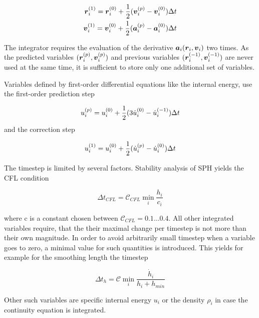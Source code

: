 \begin{eqnarray}
\label{ch02_sph02_eq020}
\boldsymbol{r}_i^{(1)} = \boldsymbol{r}_i^{(0)} + \frac{1}{2} ( \boldsymbol{v}_i^{(p)} - \boldsymbol{v}_i^{(0)} )\Delta t \\
\boldsymbol{v}_i^{(1)} = \boldsymbol{v}_i^{(0)} + \frac{1}{2} ( \boldsymbol{a}_i^{(p)} - \boldsymbol{a}_i^{(0)} )\Delta t
\end{eqnarray}

The integrator requires the evaluation of the derivative $\boldsymbol{a}_i( \boldsymbol{r}_i, \boldsymbol{v}_i)$ two times. As the predicted variables $(\boldsymbol{r}_i^{(p)}, \boldsymbol{v}_i^{(p)})$ and previous variables $(\boldsymbol{r}_i^{(-1)}, \boldsymbol{v}_i^{(-1)})$ are never used at the same time, it is sufficient to store only one additional set of variables.

Variables defined by first-order differential equations like the internal energy, use the first-order prediction step

\begin{equation}
\label{ch02_sph02_eq021}
u_i^{(p)} = u_i^{(0)} + \frac{1}{2} ( 3 \dot{u}_i^{(0)} - \dot{u}_i^{(-1)} )\Delta t \\
\end{equation}
and the correction step

\begin{equation}
\label{ch02_sph02_eq022}
u_i^{(1)} = u_i^{(0)} + \frac{1}{2} ( \dot{u}_i^{(p)} - \dot{u}_i^{(0)} )\Delta t \\
\end{equation}

The timestep is limited by several factors. Stability analysis of SPH yields the CFL condition 

\begin{equation}
\label{ch02_sph02_eq023}
\Delta t_{CFL} = \mathcal{C}_{CFL} \min_{i} \frac{h_i}{c_i}
\end{equation}

where c is a constant chosen between $\mathcal{C}_{CFL} = 0.1 \dots 0.4$. All other integrated variables require, that the their maximal change per timestep is not more than their own magnitude. In order to avoid arbitrarily small timestep when a variable goes to zero, a minimal value for such quantities is introduced. This yields for example for the smoothing length the timestep

\begin{equation}
\label{ch02_sph02_eq024}
\Delta t_{h} = \mathcal{C} \min_{i} \frac{\dot{h}_i}{h_i + h_{min}}
\end{equation}

Other such variables are specific internal energy $u_i$ or the density $\rho_i$ in case the continuity equation is integrated. 


